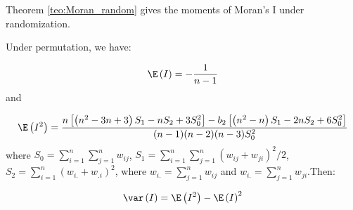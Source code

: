 \documentclass[english,12pt]{book}\usepackage[]{graphicx}\usepackage[]{xcolor}
\begin{document}









Theorem \ref{teo:Moran_random} gives the moments of Moran's I under randomization. 


\begin{theorem}\label{teo:Moran_random}
Under permutation, we have:

\begin{equation}
\E\left(I\right) = - \frac{1}{n - 1} 
\end{equation}
%
and

\begin{equation}
\E\left(I^2\right) = \frac{n\left[\left(n^2 - 3n + 3\right)S_1 - nS_2 + 3S_0^2\right]-b_2\left[\left(n^2 - n\right)S_1 - 2nS_2 + 6S_0^2\right]}{(n-1)(n-2)(n-3)S_0^2}
\end{equation}
%
where $S_0=\sum_{i = 1}^n\sum_{j=1}^nw_{ij}$, $S_1= \sum_{i = 1}^n\sum_{j = 1}^n(w_{ij} + w_{ji})^2/2$, $S_2 = \sum_{i = 1}^n(w_{i.} + w_{.i})^2$, where $w_{i.}= \sum_{j = 1}^nw_{ij}$ and $w_{i.}=\sum_{j = 1}^nw_{ji}$.Then:

\begin{equation}
\var\left(I\right)=\E\left(I^2\right) - \E\left(I\right)^2
\end{equation}
\end{theorem}
\end{document}

